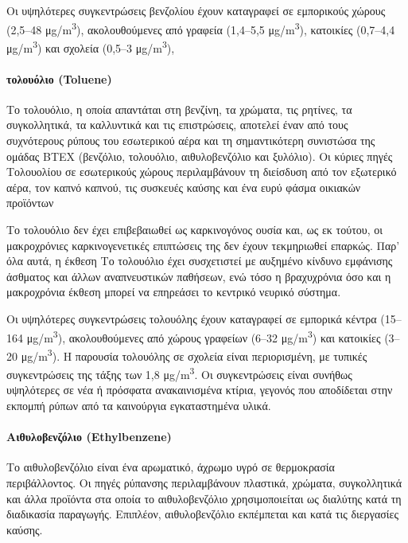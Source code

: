 Οι υψηλότερες συγκεντρώσεις βενζολίου έχουν καταγραφεί σε εμπορικούς χώρους (2,5–48 μg/m\textsuperscript{3}), ακολουθούμενες από γραφεία (1,4–5,5 μg/m\textsuperscript{3}), κατοικίες (0,7–4,4 μg/m\textsuperscript{3}) και σχολεία (0,5–3 μg/m\textsuperscript{3}),

\paragraph{τολουόλιο (Toluene)}

Το τολουόλιο, η οποία απαντάται στη βενζίνη, τα χρώματα, τις ρητίνες, τα συγκολλητικά, τα καλλυντικά και τις επιστρώσεις, αποτελεί έναν από τους συχνότερους ρύπους του εσωτερικού αέρα και τη σημαντικότερη συνιστώσα της ομάδας BTEX (βενζόλιο, τολουόλιο, αιθυλοβενζόλιο και ξυλόλιο). Οι κύριες πηγές Τολουολίου σε εσωτερικούς χώρους περιλαμβάνουν τη διείσδυση από τον εξωτερικό αέρα, τον καπνό καπνού, τις συσκευές καύσης και ένα ευρύ φάσμα οικιακών προϊόντων 

Το τολουόλιο δεν έχει επιβεβαιωθεί ως καρκινογόνος ουσία και, ως εκ τούτου, οι μακροχρόνιες καρκινογενετικές επιπτώσεις της δεν έχουν τεκμηριωθεί επαρκώς. Παρ’ όλα αυτά, η έκθεση Το τολουόλιο έχει συσχετιστεί με αυξημένο κίνδυνο εμφάνισης άσθματος και άλλων αναπνευστικών παθήσεων, ενώ τόσο η βραχυχρόνια όσο και η μακροχρόνια έκθεση μπορεί να επηρεάσει το κεντρικό νευρικό σύστημα.

Οι υψηλότερες συγκεντρώσεις τολουόλης έχουν καταγραφεί σε εμπορικά κέντρα (15–164 μg/m\textsuperscript{3}), ακολουθούμενες από χώρους γραφείων (6–32 μg/m\textsuperscript{3}) και κατοικίες (3–20 μg/m\textsuperscript{3}). Η παρουσία τολουόλης σε σχολεία είναι περιορισμένη, με τυπικές συγκεντρώσεις της τάξης των 1,8 μg/m\textsuperscript{3}. Οι συγκεντρώσεις είναι συνήθως υψηλότερες σε νέα ή πρόσφατα ανακαινισμένα κτίρια, γεγονός που αποδίδεται στην εκπομπή ρύπων από τα καινούργια εγκαταστημένα υλικά.

\paragraph{Αιθυλοβενζόλιο (Ethylbenzene)}


Το αιθυλοβενζόλιο είναι ένα αρωματικό, άχρωμο υγρό σε θερμοκρασία περιβάλλοντος. Οι πηγές ρύπανσης περιλαμβάνουν πλαστικά, χρώματα, συγκολλητικά και άλλα προϊόντα στα οποία το αιθυλοβενζόλιο χρησιμοποιείται ως διαλύτης κατά τη διαδικασία παραγωγής. Επιπλέον, αιθυλοβενζόλιο εκπέμπεται και κατά τις διεργασίες καύσης.

